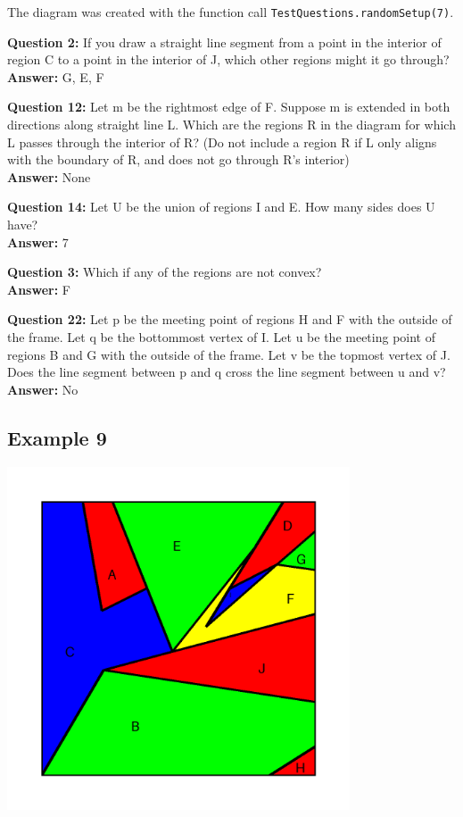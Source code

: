 \documentclass{article}    %
\begin{document}
{\small  The diagram was created with the function 
call {\tt TestQuestions.randomSetup(7)}.}

{\bf Question  2:} If you draw a straight line segment from a point in the interior of region C to  a point in the interior of J, which other regions might it go through? \\
{\bf Answer:}  {G, E, F}

{\bf Question  12:} Let m be the rightmost edge of F. Suppose m is extended in both directions along straight line L. Which are the regions R in the diagram for which L passes through the interior of R? (Do not include a region R if L only aligns with the boundary of R, and does not go through R's interior) \\
{\bf Answer:}  None

{\bf Question  14:} Let U be the union of regions I and E. How many sides does U have? \\
{\bf Answer:}  7

{\bf Question  3:} Which if any of the regions are not convex? \\
{\bf Answer:}  {F}

{\bf Question  22:} Let p be the meeting point of regions H and F with the outside of the frame. Let q be the bottommost vertex of I. Let u be the meeting point of regions B and G with the outside of the frame. Let v be the topmost vertex of J. Does the line segment between p and q cross the line segment between u and v? \\
{\bf Answer:}  No

\pagebreak

\subsection{Example 9}
\begin{center}
\includegraphics[height=4in]{Maps/RandomSetup8.png}
\end{center}
\end{document}
